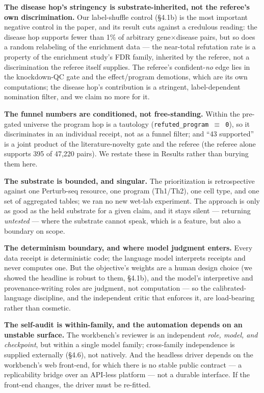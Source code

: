 \noindent \textbf{The disease hop's stringency is substrate-inherited, not the referee's own discrimination.} Our
label-shuffle control (\S{}4.1b) is the most important negative control in the paper, and its result cuts
against a credulous reading: the disease hop supports fewer than 1\% of arbitrary gene$\times$disease pairs, but so does a
random relabeling of the enrichment data --- the near-total refutation rate is a property of the enrichment
study's FDR family, inherited by the referee, not a discrimination the referee itself supplies. The
referee's confident-\emph{no} edge lies in the knockdown-QC gate and the effect/program demotions, which
are its own computations; the disease hop's contribution is a stringent, label-dependent nomination filter,
and we claim no more for it.

\noindent \textbf{The funnel numbers are conditioned, not free-standing.} Within the pre-gated universe the program hop is
a tautology (\texttt{refuted\_program\ $\equiv$\ 0}), so it discriminates in an individual receipt, not as a funnel filter;
and ``43 supported'' is a joint product of the literature-novelty gate and the referee (the referee alone
supports 395 of 47,220 pairs). We restate these in Results rather than burying them here.

\noindent \textbf{The substrate is bounded, and singular.} The prioritization is retrospective against one Perturb-seq
resource, one program (Th1/Th2), one cell type, and one set of aggregated tables; we ran no new wet-lab
experiment. The approach is only as good as the held substrate for a given claim, and it stays silent ---
returning \emph{untested} --- where the substrate cannot speak, which is a feature, but also a boundary on scope.

\noindent \textbf{The determinism boundary, and where model judgment enters.} Every data receipt is deterministic code; the
language model interprets receipts and never computes one. But the objective's weights are a human design
choice (we showed the headline is robust to them, \S{}4.1b), and the model's interpretive and provenance-writing
roles are judgment, not computation --- so the calibrated-language discipline, and the independent critic that
enforces it, are load-bearing rather than cosmetic.

\noindent \textbf{The self-audit is within-family, and the automation depends on an unstable surface.} The workbench's
reviewer is an independent \emph{role, model, and checkpoint}, but within a single model family; cross-family
independence is supplied externally (\S{}4.6), not natively. And the headless driver depends on the workbench's
web front-end, for which there is no stable public contract --- a replicability bridge over an API-less
platform --- not a durable interface. If the front-end changes, the driver must be re-fitted.

